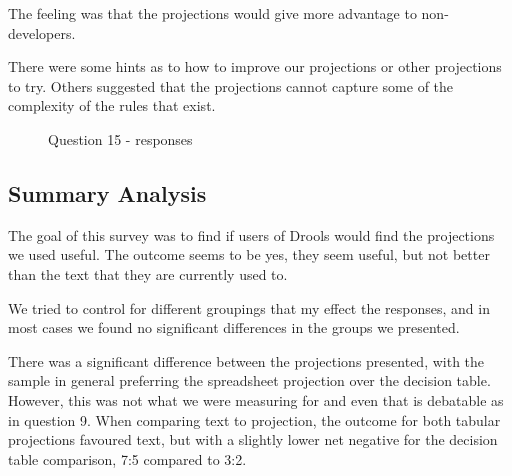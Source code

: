 The feeling was that the projections would give more advantage to non-developers.

There were some hints as to how to improve our projections or other projections to try.
Others suggested that the projections cannot capture some of the complexity of the rules that exist.

\begin{figure}[H]
    \centering
    \caption{Question 15 - responses}
    \label{fig:Q15_wordcloud}
\end{figure}


\subsection{Summary Analysis}

The goal of this survey was to find if users of Drools would find the projections we used useful.
The outcome seems to be yes, they seem useful, but not better than the text that they are currently used to.

We tried to control for different groupings that my effect the responses, and in most cases we found no significant differences in the groups we presented.

There was a significant difference between the projections presented, with the sample in general preferring the spreadsheet projection over the decision table. 
However, this was not what we were measuring for and even that is debatable as in question 9.
When comparing text to projection, the outcome for both tabular projections favoured text, but with a slightly lower net negative for the decision table comparison, 7:5 compared to 3:2.
